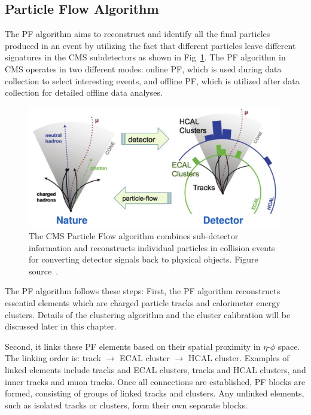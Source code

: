 \subsection{Particle Flow Algorithm}
\label{subsec:PF}
The PF algorithm aims to reconstruct and identify all the final particles produced in an event by utilizing the fact that different particles leave different signatures in the CMS subdetectors as shown in Fig~\ref{fig:PF_diagram}.
The PF algorithm in CMS operates in two different modes: online PF, which is used during data collection to select interesting events, and offline PF, which is utilized after data collection for detailed offline data analyses. 

\begin{figure}[t!]
\centering
\includegraphics[width=0.99\textwidth]{figures/PF.png}
\caption[A diagram of the PF algorithm]
        {The CMS Particle Flow algorithm combines sub-detector information and reconstructs individual
          particles in collision events for converting detector signals back to physical objects.
          Figure source~\cite{PF_diagram}.}
\label{fig:PF_diagram}
\end{figure}

The PF algorithm follows these steps:%
First, the PF algorithm reconstructs essential elements which are charged particle tracks and calorimeter energy clusters.
Details of the clustering algorithm and the cluster calibration will be discussed later in this chapter.

Second, it links these PF elements based on their spatial proximity in $\eta$-$\phi$ space.
The linking order is: track $\rightarrow$ ECAL cluster $\rightarrow$ HCAL cluster.
Examples of linked elements include tracks and ECAL clusters, tracks and HCAL clusters, and inner tracks and muon tracks.
Once all connections are established, PF blocks are formed, consisting of groups of linked tracks and clusters.
Any unlinked elements, such as isolated tracks or clusters, form their own separate blocks.

